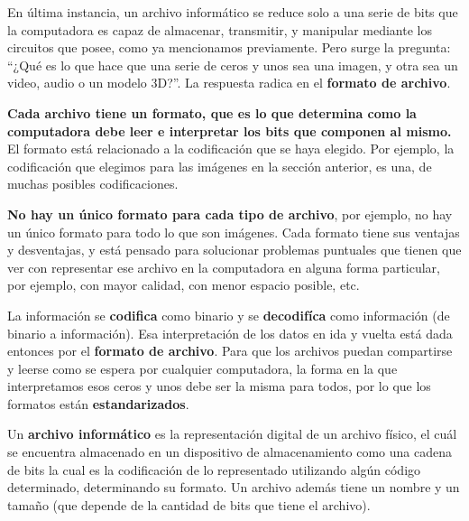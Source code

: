 En última instancia, un archivo informático se reduce solo a una serie de bits que la
computadora es capaz de almacenar, transmitir, y manipular mediante los circuitos
que posee, como ya mencionamos previamente. Pero surge la pregunta: ``¿Qué es lo
que hace que una serie de ceros y unos sea una imagen, y otra sea un video, audio
o un modelo 3D?''. La respuesta radica en el \textbf{formato de archivo}.

\textbf{Cada archivo tiene un formato, que es lo que determina como la computadora
debe leer e interpretar los bits que componen al mismo.} El formato
está relacionado a la codificación que se haya elegido. Por ejemplo, la
codificación que elegimos para las imágenes en la sección anterior, es una, de
muchas posibles codificaciones.

\textbf{No hay un único formato para cada tipo de archivo}, por ejemplo, no hay
un único formato para todo lo que son imágenes. Cada formato tiene sus ventajas
y desventajas, y está pensado para solucionar problemas puntuales que tienen
que ver con representar ese archivo en la computadora en alguna forma particular,
por ejemplo, con mayor calidad, con menor espacio posible, etc.

La información se \textbf{codifica} como binario y se \textbf{decodifíca} como
información (de binario a información). Esa interpretación de los datos en ida y
vuelta está dada entonces por el \textbf{formato de archivo}. Para que los
archivos puedan compartirse y leerse como se espera por cualquier computadora,
la forma en la que interpretamos esos ceros y unos debe ser la misma para todos,
por lo que los formatos están \textbf{estandarizados}.

\begin{definition}
    Un \textbf{archivo informático} es la representación digital de un archivo
    físico, el cuál se encuentra almacenado en un dispositivo de almacenamiento
    como una cadena de bits la cual es la codificación de lo representado utilizando
    algún código determinado, determinando su formato. Un archivo además tiene un
    nombre y un tamaño (que depende de la cantidad de bits que tiene el archivo).\autocite[vid. p.13]{gookin_2005}
\end{definition}

